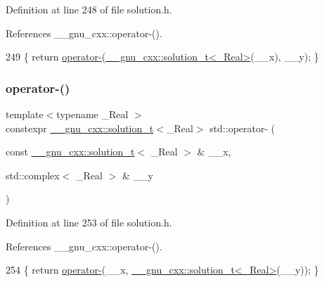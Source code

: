 Definition at line 248 of file solution.\+h.



References \+\_\+\+\_\+gnu\+\_\+cxx\+::operator-\/().


\begin{DoxyCode}
249     \{ \textcolor{keywordflow}{return} \hyperlink{namespacestd_a4f4e9391eaa235d953faa99bff006e3d}{operator-}(\hyperlink{namespace____gnu__cxx_ae20ea642de50eb361074c62676b0159c}{\_\_gnu\_cxx::solution\_t<\_Real>}(\_\_x), \_\_y); \}
\end{DoxyCode}
\mbox{\label{namespacestd_a308d96e2c3172aebb97f03880e8c5946}} 
\subsubsection{\texorpdfstring{operator-\/()}{operator-()}\hspace{0.1cm}{\footnotesize\ttfamily [5/6]}}
{\footnotesize\ttfamily template$<$typename \+\_\+\+Real $>$ \\
constexpr \hyperlink{namespace____gnu__cxx_ae20ea642de50eb361074c62676b0159c}{\+\_\+\+\_\+gnu\+\_\+cxx\+::solution\+\_\+t}$<$\+\_\+\+Real$>$ std\+::operator-\/ (\begin{DoxyParamCaption}\item[{const \hyperlink{namespace____gnu__cxx_ae20ea642de50eb361074c62676b0159c}{\+\_\+\+\_\+gnu\+\_\+cxx\+::solution\+\_\+t}$<$ \+\_\+\+Real $>$ \&}]{\+\_\+\+\_\+x,  }\item[{std\+::complex$<$ \+\_\+\+Real $>$ \&}]{\+\_\+\+\_\+y }\end{DoxyParamCaption})}



Definition at line 253 of file solution.\+h.



References \+\_\+\+\_\+gnu\+\_\+cxx\+::operator-\/().


\begin{DoxyCode}
254     \{ \textcolor{keywordflow}{return} \hyperlink{namespacestd_a4f4e9391eaa235d953faa99bff006e3d}{operator-}(\_\_x, \hyperlink{namespace____gnu__cxx_ae20ea642de50eb361074c62676b0159c}{\_\_gnu\_cxx::solution\_t<\_Real>}(\_\_y)); \}
\end{DoxyCode}
\mbox{\label{namespacestd_a4f4e9391eaa235d953faa99bff006e3d}} 
